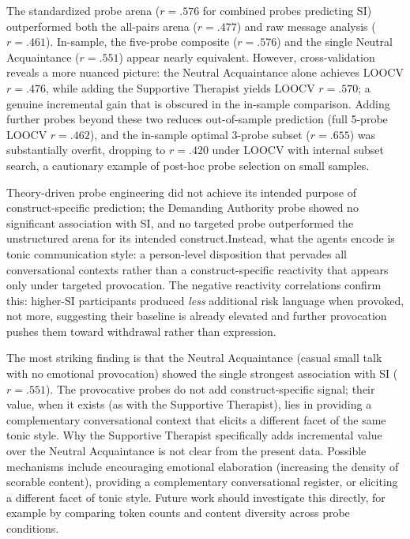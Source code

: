 \documentclass[review,12pt,authoryear]{elsarticle}
\begin{document}
The standardized probe arena ($r = .576$ for combined probes predicting SI) outperformed both the all-pairs arena ($r = .477$) and raw message analysis ($r = .461$). In-sample, the five-probe composite ($r = .576$) and the single Neutral Acquaintance ($r = .551$) appear nearly equivalent. However, cross-validation reveals a more nuanced picture: the Neutral Acquaintance alone achieves LOOCV $r = .476$, while adding the Supportive Therapist yields LOOCV $r = .570$; a genuine incremental gain that is obscured in the in-sample comparison. Adding further probes beyond these two reduces out-of-sample prediction (full 5-probe LOOCV $r = .462$), and the in-sample optimal 3-probe subset ($r = .655$) was substantially overfit, dropping to $r = .420$ under LOOCV with internal subset search, a cautionary example of post-hoc probe selection on small samples.

Theory-driven probe engineering did not achieve its intended purpose of construct-specific prediction; the Demanding Authority probe showed no significant association with SI, and no targeted probe outperformed the unstructured arena for its intended construct.Instead, what the agents encode is tonic communication style: a person-level disposition that pervades all conversational contexts rather than a construct-specific reactivity that appears only under targeted provocation. The negative reactivity correlations confirm this: higher-SI participants produced \textit{less} additional risk language when provoked, not more, suggesting their baseline is already elevated and further provocation pushes them toward withdrawal rather than expression.

The most striking finding is that the Neutral Acquaintance (casual small talk with no emotional provocation) showed the single strongest association with SI ($r = .551$). The provocative probes do not add construct-specific signal; their value, when it exists (as with the Supportive Therapist), lies in providing a complementary conversational context that elicits a different facet of the same tonic style. Why the Supportive Therapist specifically adds incremental value over the Neutral Acquaintance is not clear from the present data. Possible mechanisms include encouraging emotional elaboration (increasing the density of scorable content), providing a complementary conversational register, or eliciting a different facet of tonic style. Future work should investigate this directly, for example by comparing token counts and content diversity across probe conditions.
\end{document}
